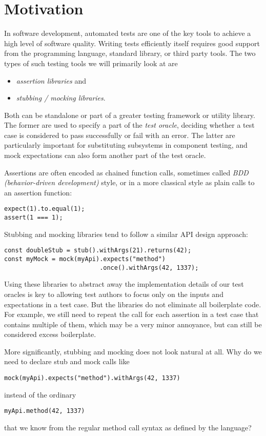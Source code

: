 \section{Motivation}
In software development, automated tests are one of the key tools
to achieve a high level of software quality.
Writing tests efficiently itself requires good support
from the programming language, standard library, or third party tools.
The two types of such testing tools we will primarily look at are
\begin{itemize}
  \item \textit{assertion libraries} and
  \item \textit{stubbing / mocking libraries}.
\end{itemize}
Both can be standalone or part of a greater testing framework or utility library.
The former are used to specify a part of the \textit{test oracle},
deciding whether a test case is considered to pass successfully or fail with an error.
The latter are particularly important for substituting subsystems in component testing,
and mock expectations can also form another part of the test oracle.

Assertions are often encoded as chained function calls,
sometimes called \textit{BDD (behavior-driven development)} style,
or in a more classical style as plain calls to an assertion function:
\autocite{ChaiBddDoc}\autocite{ChaiTddDoc}
\begin{verbatim}
expect(1).to.equal(1);
assert(1 === 1);
\end{verbatim}
Stubbing and mocking libraries tend to follow a similar API design approach:
\autocite{SinonStubDoc}\autocite{SinonMockDoc}
\begin{verbatim}
const doubleStub = stub().withArgs(21).returns(42);
const myMock = mock(myApi).expects("method")
                          .once().withArgs(42, 1337);
\end{verbatim}

Using these libraries to abstract away
the implementation details of our test oracles
is key to allowing test authors to
focus only on the inputs and expectations in a test case.
But the libraries do not eliminate all boilerplate code.
For example, we still need to repeat the  call
for each assertion in a test case that contains multiple of them,
which may be a very minor annoyance,
but can still be considered excess boilerplate.

More significantly, stubbing and mocking does not look natural at all.
Why do we need to declare stub and mock calls like
\begin{verbatim}
mock(myApi).expects("method").withArgs(42, 1337)
\end{verbatim}
instead of the ordinary
\begin{verbatim}
myApi.method(42, 1337)
\end{verbatim}
that we know from the regular method call syntax as defined by the language?
